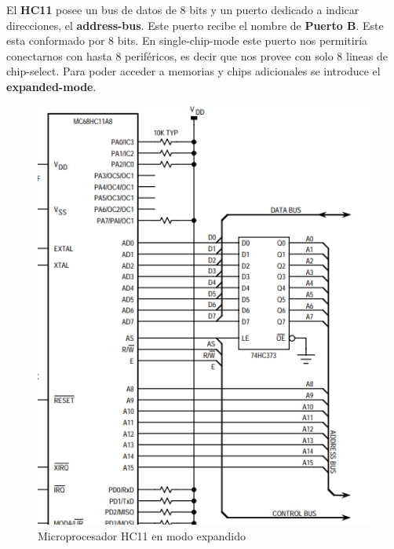 El \textbf{HC11} posee un bus de datos de 8 bits y un puerto dedicado a indicar direcciones, el \textbf{address-bus}. Este puerto recibe el nombre de \textbf{Puerto B}. Este esta conformado por 8 bits. En single-chip-mode este puerto nos permitiría conectarnos con hasta 8 periféricos, es decir que nos provee con solo 8 lineas de chip-select.  Para poder acceder a memorias y chips adicionales se introduce el \textbf{expanded-mode}.
\begin{figure}[H]
	\centering
	\includegraphics[scale=0.4]{ImagenesEjercicio3/MicroHC11ExpandedMode.PNG}
	\caption{Microprocesador HC11 en modo expandido}
	\label{fig:microhc11}
\end{figure}


